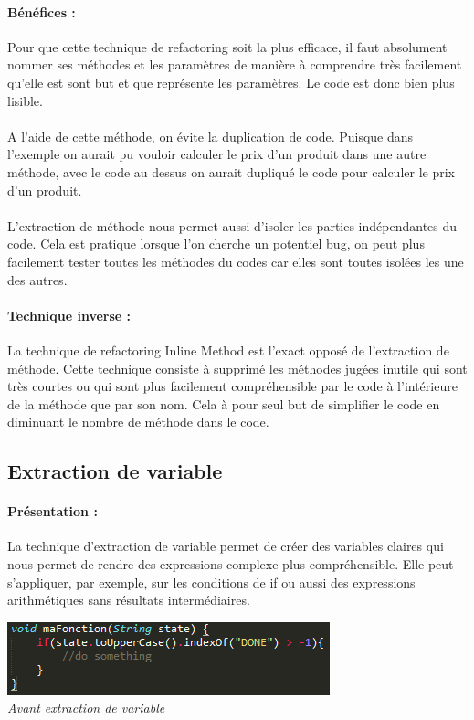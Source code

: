 \documentclass[a4paper,twoside,12pt,openright]{report}
\begin{document}
\paragraph{Bénéfices :}
Pour que cette technique de refactoring soit la plus efficace, il faut absolument nommer ses méthodes et les paramètres de manière à comprendre très facilement qu'elle est sont but et que représente les paramètres. Le code est donc bien plus lisible.\\\\
A l'aide de cette méthode, on évite la duplication de code. Puisque dans l'exemple on aurait pu vouloir calculer le prix d'un produit dans une autre méthode, avec le code au dessus on aurait dupliqué le code pour calculer le prix d'un produit.\\\\
L'extraction de méthode nous permet aussi d'isoler les parties indépendantes du code. Cela est pratique lorsque l'on cherche un potentiel bug, on peut plus facilement tester toutes les méthodes du codes car elles sont toutes isolées les une des autres.

\paragraph{Technique inverse :}
La technique de refactoring Inline Method est l'exact opposé de l'extraction de méthode. Cette technique consiste à supprimé les méthodes jugées inutile qui sont très courtes ou qui sont plus facilement compréhensible par le code à l'intérieure de la méthode que par son nom. Cela à pour seul but de simplifier le code en diminuant le nombre de méthode dans le code.\\

\subsection{Extraction de variable}
\paragraph{Présentation :}
La technique d'extraction de variable permet de créer des variables claires qui nous permet de rendre des expressions complexe plus compréhensible.
Elle peut s'appliquer, par exemple, sur les conditions de if ou aussi des expressions arithmétiques sans résultats intermédiaires.

\begin{center}
\includegraphics[scale=1]{Image/Extraction_Variable.png}\\
\itshape{Avant extraction de variable}
\end{center}
\end{document}
